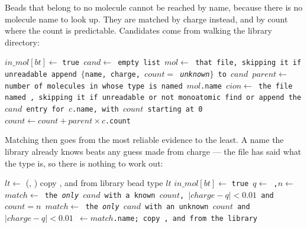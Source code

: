 Beads that belong to no molecule cannot be reached by name, because there is no
molecule name to look up. They are matched by charge instead, and by count where
the count is predictable. Candidates come from walking the library directory:

\begin{algorithmic}[1]
    \St $in\_mol[bt] \gets$ \tt{true}
  \EndFor
  \St $cand \gets$ empty list
    \St $mol \gets$ that file, skipping it if unreadable
      \St append $\{$name, charge, $count = $ \emph{unknown}$\}$ to
        $cand$
    \EndIf
    \St $parent \gets$ number of molecules in  whose type is named
      $mol$.name
      \Continue{}
    \EndIf
      \St $cion \gets$ the file named , skipping it if
        unreadable or not monoatomic
      \St find or append the $cand$ entry for $c$.name, with $count$ starting
        at 0
      \St $count \gets count + parent \times c$.count
    \EndFor
  \EndFor
\end{algorithmic}
\algbottomrule

\noindent
Matching then goes from the most reliable evidence to the least. A name the
library already knows beats any guess made from charge --- the file has said
what the type is, so there is nothing to work out:

\begin{algorithmic}[1]
    \St $lt \gets$ (, )
      \Continue
    \EndIf
    \St copy ,  and  from library bead type
      $lt$
    \St $in\_mol[bt] \gets$ \tt{true}
  \EndFor
    \St $q \gets$ ,\quad $n \gets$
    \St $match \gets$ the \emph{only} $cand$ with a known $count$,
      $|charge - q| < 0.01$ and $count = n$
      \St $match \gets$ the \emph{only} $cand$ with an unknown $count$ and
        $|charge - q| < 0.01$
    \EndIf
      \St {} $\gets match$.name; copy ,  and
         from the library
    \EndIf
  \EndFor
\end{algorithmic}
\algbottomrule

